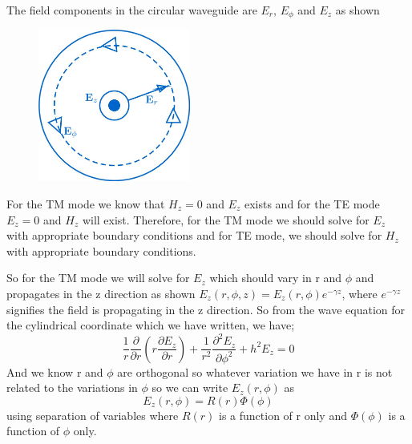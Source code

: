 The field components in the circular waveguide are $E_r$, $E_\phi$ and $E_z$ as shown
\begin{figure}[H]
\centering
\includegraphics[height=5cm]{./graphics/fig_5.1}
\caption{}
\label{fig:fig5}
\end{figure}

For the TM mode we know that $H_z=0$ and $E_z$ exists and for the TE mode $E_z=0$ and $H_z$ will exist. Therefore, for the TM mode we should solve for $E_z$ with appropriate boundary conditions and for TE mode, we should solve for $H_z$ with appropriate boundary conditions. 

So for the TM mode we will solve for $E_z$ which should vary in r and $\phi$ and propagates in the z direction as shown $E_z(r,\phi, z)=E_z(r,\phi)e^{-\gamma z}$, where $e^{-\gamma z}$ signifies the field is propagating in the z direction. So from the wave equation for the cylindrical coordinate which we have written, we have;
\begin{equation}
\frac{1}{r}\frac{\partial}{\partial r}(r\frac{\partial E_z}{\partial r}) + \frac{1}{r^2}\frac{\partial^2 E_z}{\partial\phi^2} + h^2 E_z = 0 
\label{eqn12.3}
\end{equation}
And we know r and $\phi$ are orthogonal so whatever variation we have in r is not related to the variations in $\phi$ so we can write $E_z(r, \phi)$ as
$$
E_z(r, \phi) = R(r)\Phi(\phi) 
$$
using separation of variables where $R(r)$ is a function of r only and $\Phi(\phi)$ is a function of $\phi$ only.

